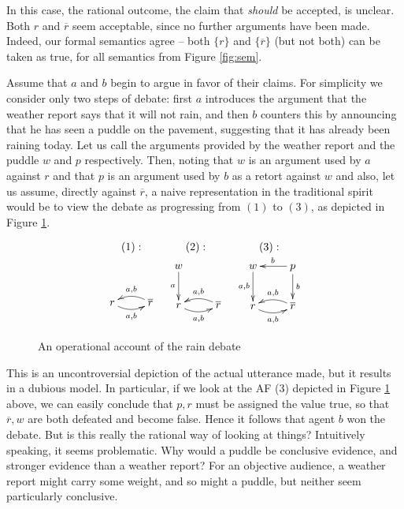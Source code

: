 \documentclass[greybox]{svmult}
\renewcommand{\bar}[1]{\overline{#1}}
\begin{document}
In this case, the rational outcome, the claim that \emph{should} be accepted, is unclear. Both $r$ and $\bar r$ seem acceptable, since no further arguments have been made. Indeed, our formal semantics agree -- both $\{r\}$ and $\{\bar r\}$ (but not both) can be taken as true, for all semantics from Figure \ref{fig:sem}.

Assume that $a$ and $b$ begin to argue in favor of their claims. For simplicity we consider only two steps of debate: first $a$ introduces the argument that the weather report says that it will not rain, and then $b$ counters this by announcing that he has seen a puddle on the pavement, suggesting that it has already been raining today. Let us call the arguments provided by the weather report and the puddle $w$ and $p$ respectively. Then, noting that $w$ is an argument used by $a$ against $r$ and that $p$ is an argument used by $b$ as a retort against $w$ and also, let us assume, directly against $\bar r$, a naive representation in the traditional spirit would be to view the debate as progressing from $(1)$ to $(3)$, as depicted in Figure \ref{fig:wrong}.
\begin{figure}
$$
\begin{array}{ccc}
(1): & (2): & (3): \\
\xymatrix{ \\ r\ar@/_/[r]_{a,b} & \bar{r}\ar@/_/[l]_{a,b} } &
\xymatrix{
        w\ar[d]_{a} & \\
        r\ar@/_/[r]_{a,b} & \bar{r}\ar@/_/[l]_{a,b} } &
\xymatrix{
        w\ar[d]_{a,b} & p \ar[l]_{b} \ar[d]^{b} \\
        r\ar@/_/[r]_{{a},{b}} & \bar{r}\ar@/_/[l]_{{a},{b}} }
\end{array}
$$
\caption{An operational account of the rain debate}
\label{fig:wrong}
\end{figure}

This is an uncontroversial depiction of the actual utterance made, but it results in a dubious model. In particular, if we look at the AF (3) depicted in Figure \ref{fig:wrong} above, we can easily conclude that $p, r$ must be assigned the value true, so that $\bar r, w$ are both defeated and become false. Hence it follows that agent ${b}$ won the debate. But is this really the rational way of looking at things?  Intuitively speaking, it seems problematic. Why would a puddle be conclusive evidence, and stronger evidence than a weather report? For an objective audience, a weather report might carry some weight, and so might a puddle, but neither seem particularly conclusive.
\end{document}
